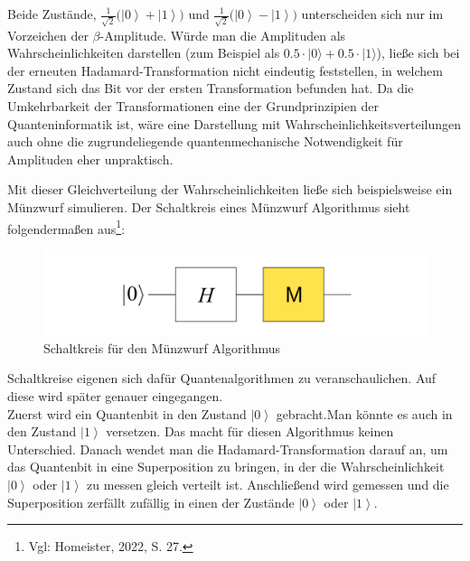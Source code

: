 \begin{tcolorbox}[title=Kommentar,
    title filled=false,
    colback=cyan!5!white,
    colframe=cyan!75!black]
Beide Zustände,  $\frac{1}{\sqrt2}(\left|\left.0\right\rangle+\right.\left|\left.1\right\rangle)\right.$ und $\frac{1}{\sqrt2}(\left|\left.0\right\rangle-\right.\left|\left.1\right\rangle)\right.$ unterscheiden sich nur im Vorzeichen der $\beta$-Amplitude. Würde man die Amplituden als Wahrscheinlichkeiten darstellen (zum Beispiel als $0.5\cdot\left|0\right.\rangle+0.5\cdot\left|1\right.\rangle$), ließe sich bei der erneuten Hadamard-Transformation nicht eindeutig feststellen, in welchem Zustand sich das Bit vor der ersten Transformation befunden hat. Da die Umkehrbarkeit der Transformationen eine der Grundprinzipien der Quanteninformatik ist, wäre eine Darstellung mit Wahrscheinlichkeitsverteilungen auch ohne die zugrundeliegende quantenmechanische Notwendigkeit für Amplituden eher unpraktisch.
\end{tcolorbox}

Mit dieser Gleichverteilung der Wahrscheinlichkeiten ließe sich beispielsweise ein Münzwurf simulieren. Der Schaltkreis eines Münzwurf Algorithmus sieht folgendermaßen aus\footnote{Vgl: Homeister, 2022, S. 27.}: \\

\begin{figure}[h]
    \centering
    \includegraphics[width=0.7\linewidth]{img/MuenzwurfSchaltkreis.png}
    \caption{Schaltkreis für den Münzwurf Algorithmus}
    \label{fig:Muenzwurf}
\end{figure}


Schaltkreise eigenen sich dafür Quantenalgorithmen zu veranschaulichen. Auf diese wird später genauer eingegangen.\\

Zuerst wird ein Quantenbit in den Zustand $\left|0\right\rangle$ gebracht.Man könnte es auch in den Zustand $\left|1\right\rangle$ versetzen. Das macht für diesen Algorithmus keinen Unterschied. Danach wendet man die Hadamard-Transformation darauf an, um das Quantenbit in eine Superposition zu bringen, in der die Wahrscheinlichkeit $\left|0\right\rangle$ oder $\left|1\right\rangle$ zu messen gleich verteilt ist. Anschließend wird gemessen und die Superposition zerfällt zufällig in einen der Zustände $\left|0\right\rangle$ oder $\left|1\right\rangle$.


